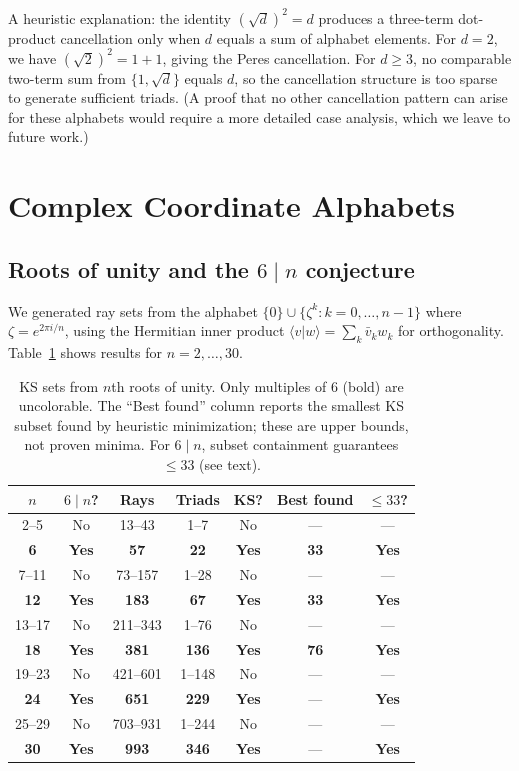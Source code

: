 \documentclass[12pt,a4paper]{article}
\newcommand{\braket}[2]{\langle#1|#2\rangle}
\begin{document}
A heuristic explanation: the identity $(\sqrt{d})^2 = d$ produces a three-term dot-product cancellation only when $d$ equals a sum of alphabet elements. For $d = 2$, we have $(\sqrt{2})^2 = 1 + 1$, giving the Peres cancellation. For $d \geq 3$, no comparable two-term sum from $\{1, \sqrt{d}\}$ equals $d$, so the cancellation structure is too sparse to generate sufficient triads. (A proof that no other cancellation pattern can arise for these alphabets would require a more detailed case analysis, which we leave to future work.)

\section{Complex Coordinate Alphabets}\label{sec:complex}

\subsection{Roots of unity and the $6 \mid n$ conjecture}\label{sec:roots}

We generated ray sets from the alphabet $\{0\} \cup \{\zeta^k : k = 0, \ldots, n-1\}$ where $\zeta = e^{2\pi i/n}$, using the Hermitian inner product $\braket{v}{w} = \sum_k \bar{v}_k w_k$ for orthogonality. Table~\ref{tab:roots} shows results for $n = 2, \ldots, 30$.

\begin{table}[ht]
\centering
\caption{KS sets from $n$th roots of unity. Only multiples of 6 (bold) are uncolorable. The ``Best found'' column reports the smallest KS subset found by heuristic minimization; these are upper bounds, not proven minima. For $6 \mid n$, subset containment guarantees $\leq 33$ (see text).}
\label{tab:roots}
\begin{tabular}{ccccccc}
\toprule
$n$ & $6 \mid n$? & Rays & Triads & KS? & Best found & $\leq 33$? \\
\midrule
2--5 & No & 13--43 & 1--7 & No & --- & --- \\
\textbf{6} & \textbf{Yes} & \textbf{57} & \textbf{22} & \textbf{Yes} & \textbf{33} & \textbf{Yes} \\
7--11 & No & 73--157 & 1--28 & No & --- & --- \\
\textbf{12} & \textbf{Yes} & \textbf{183} & \textbf{67} & \textbf{Yes} & \textbf{33} & \textbf{Yes} \\
13--17 & No & 211--343 & 1--76 & No & --- & --- \\
\textbf{18} & \textbf{Yes} & \textbf{381} & \textbf{136} & \textbf{Yes} & \textbf{76} & \textbf{Yes} \\
19--23 & No & 421--601 & 1--148 & No & --- & --- \\
\textbf{24} & \textbf{Yes} & \textbf{651} & \textbf{229} & \textbf{Yes} & --- & \textbf{Yes} \\
25--29 & No & 703--931 & 1--244 & No & --- & --- \\
\textbf{30} & \textbf{Yes} & \textbf{993} & \textbf{346} & \textbf{Yes} & --- & \textbf{Yes} \\
\bottomrule
\end{tabular}
\end{table}
\end{document}
